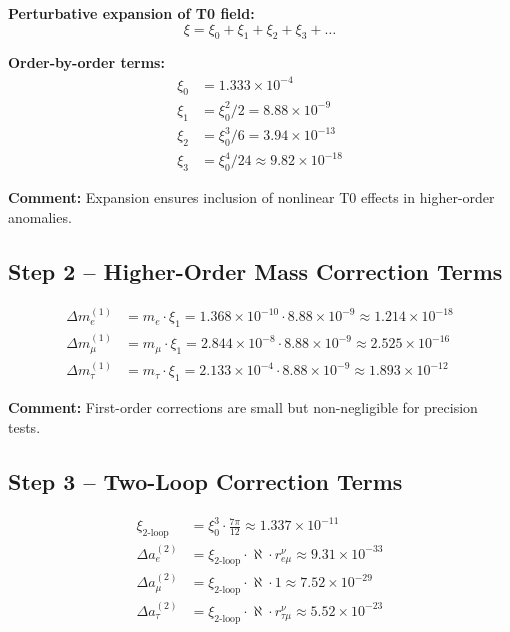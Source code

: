 \documentclass[12pt,a4paper]{article}
\begin{document}
\textbf{Perturbative expansion of T0 field:}
\begin{equation}
	\xi = \xi_0 + \xi_1 + \xi_2 + \xi_3 + \dots
\end{equation}

\textbf{Order-by-order terms:}
\begin{align}
	\xi_0 &= 1.333 \times 10^{-4} \\
	\xi_1 &= \xi_0^2 / 2 = 8.88 \times 10^{-9} \\
	\xi_2 &= \xi_0^3 / 6 = 3.94 \times 10^{-13} \\
	\xi_3 &= \xi_0^4 / 24 \approx 9.82 \times 10^{-18}
\end{align}

\textbf{Comment:} Expansion ensures inclusion of nonlinear T0 effects in higher-order anomalies.

\subsection{Step 2 – Higher-Order Mass Correction Terms}

\begin{align}
	\Delta m_e^{(1)} &= m_e \cdot \xi_1 = 1.368 \times 10^{-10} \cdot 8.88 \times 10^{-9} \approx 1.214 \times 10^{-18} \\
	\Delta m_\mu^{(1)} &= m_\mu \cdot \xi_1 = 2.844 \times 10^{-8} \cdot 8.88 \times 10^{-9} \approx 2.525 \times 10^{-16} \\
	\Delta m_\tau^{(1)} &= m_\tau \cdot \xi_1 = 2.133 \times 10^{-4} \cdot 8.88 \times 10^{-9} \approx 1.893 \times 10^{-12}
\end{align}

\textbf{Comment:} First-order corrections are small but non-negligible for precision tests.

\subsection{Step 3 – Two-Loop Correction Terms}

\begin{align}
	\xi_\text{2-loop} &= \xi_0^3 \cdot \frac{7\pi}{12} \approx 1.337 \times 10^{-11} \\
	\Delta a_e^{(2)} &= \xi_\text{2-loop} \cdot \aleph \cdot r_{e\mu}^{\nu} \approx 9.31 \times 10^{-33} \\
	\Delta a_\mu^{(2)} &= \xi_\text{2-loop} \cdot \aleph \cdot 1 \approx 7.52 \times 10^{-29} \\
	\Delta a_\tau^{(2)} &= \xi_\text{2-loop} \cdot \aleph \cdot r_{\tau\mu}^{\nu} \approx 5.52 \times 10^{-23}
\end{align}
\end{document}
